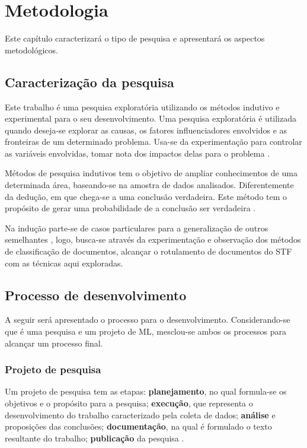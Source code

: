 \chapter[Metodologia]{Metodologia}
Este capítulo caracterizará o tipo de pesquisa e apresentará os aspectos metodológicos.

\section{Caracterização da pesquisa}

Este trabalho é uma pesquisa exploratória utilizando os métodos indutivo e experimental para o seu desenvolvimento. Uma pesquisa exploratória é utilizada quando deseja-se explorar as causas, os fatores influenciadores envolvidos e as fronteiras de um determinado problema. Usa-se da experimentação para controlar as variáveis envolvidas, tomar nota dos impactos delas para o problema \cite{prodanov_metodologia_2013}.

Métodos de pesquisa indutivos tem o objetivo de ampliar conhecimentos de uma determinada área, baseando-se na amostra de dados analisados. Diferentemente da dedução, em que chega-se a uma conclusão verdadeira. Este método tem o propósito de gerar uma probabilidade de a conclusão ser verdadeira \cite{prodanov_metodologia_2013}.

Na indução parte-se de casos particulares para a generalização de outros semelhantes \cite{prodanov_metodologia_2013},
logo, busca-se através da experimentação e observação dos métodos de classificação de documentos, alcançar o rotulamento de documentos do STF com as técnicas aqui exploradas. 

\section{Processo de desenvolvimento}

A seguir será apresentado o processo para o desenvolvimento. Considerando-se que é uma pesquisa e um projeto de ML, mesclou-se ambos os processos para alcançar um processo final.

\subsection{Projeto de pesquisa} \label{sec:projetoPesquisa}

Um projeto de pesquisa tem as etapas: \textbf{planejamento}, no qual formula-se os objetivos e o propósito para a pesquisa; \textbf{execução}, que representa o desenvolvimento do trabalho caracterizado pela coleta de dados; \textbf{análise} e proposições das conclusões; \textbf{documentação}, na qual é formulado o texto resultante do trabalho; \textbf{publicação} da pesquisa \cite{prodanov_metodologia_2013}.

